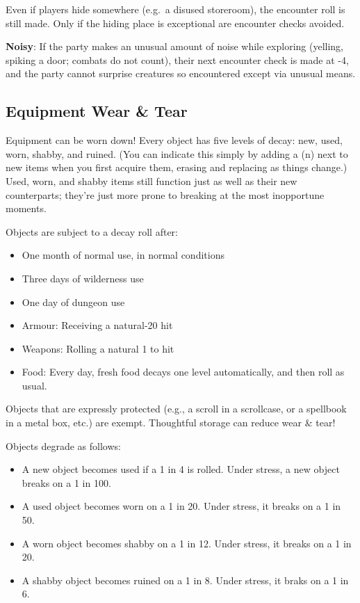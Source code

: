 \documentclass{book}
\providecommand{\tightlist}{%
\setlength{\itemsep}{0pt}\setlength{\parskip}{0pt}}
\begin{document}
Even if players hide somewhere (e.g.~a disused storeroom), the encounter
roll is still made. Only if the hiding place is exceptional are
encounter checks avoided.

\textbf{Noisy}: If the party makes an unusual amount of noise while
exploring (yelling, spiking a door; combats do not count), their next
encounter check is made at -4, and the party cannot surprise creatures
so encountered except via unusual means.

\subsection*{Equipment Wear \& Tear}\label{equipment-wear-tear}

Equipment can be worn down! Every object has five levels of decay: new,
used, worn, shabby, and ruined. (You can indicate this simply by adding
a (n) next to new items when you first acquire them, erasing and
replacing as things change.) Used, worn, and shabby items still function
just as well as their new counterparts; they're just more prone to
breaking at the most inopportune moments.

Objects are subject to a decay roll after:

\begin{itemize}
\tightlist
\item
  One month of normal use, in normal conditions
\item
  Three days of wilderness use
\item
  One day of dungeon use
\item
  Armour: Receiving a natural-20 hit
\item
  Weapons: Rolling a natural 1 to hit
\item
  Food: Every day, fresh food decays one level automatically, and then
  roll as usual.
\end{itemize}

Objects that are expressly protected (e.g., a scroll in a scrollcase, or
a spellbook in a metal box, etc.) are exempt. Thoughtful storage can
reduce wear \& tear!

Objects degrade as follows:

\begin{itemize}
\tightlist
\item
  A new object becomes used if a 1 in 4 is rolled. Under stress, a new
  object breaks on a 1 in 100.
\item
  A used object becomes worn on a 1 in 20. Under stress, it breaks on a
  1 in 50.
\item
  A worn object becomes shabby on a 1 in 12. Under stress, it breaks on
  a 1 in 20.
\item
  A shabby object becomes ruined on a 1 in 8. Under stress, it braks on
  a 1 in 6.
\end{itemize}
\end{document}
